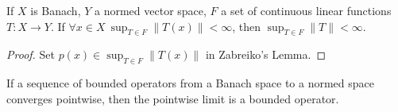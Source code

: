 \documentclass[letterpaper,11pt]{report}
\begin{document}
\begin{thm} If $X$ is Banach, $Y$ a normed vector space, $F$ a set of continuous linear functions $T:X\rightarrow Y$. If $\forall x \in X\ \sup_{T\in F} \|T(x)\| < \infty$, then $\sup_{T \in F} \|T\| < \infty$.
\end{thm}
\begin{proof} Set $p(x) \in \sup_{T\in F} \|T(x)\|$ in Zabreiko's Lemma.
\end{proof}

\begin{cor} If a sequence of bounded operators from a Banach space to a normed space converges pointwise, then the pointwise limit is a bounded operator.
\end{cor}




\end{document}
